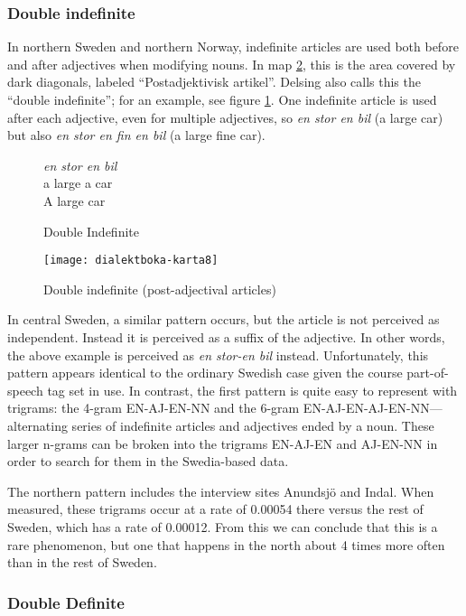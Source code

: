 \subsubsection{Double indefinite}

In northern Sweden and northern Norway, indefinite articles are used
both before and after adjectives when modifying nouns. In map
\ref{double-indefinite-map}, this is the area covered by dark
diagonals, labeled ``Postadjektivisk artikel''. Delsing also calls
this the ``double indefinite''; for an example, see figure
\ref{double-indefinite-example}. One indefinite article is used after
each adjective, even for multiple adjectives, so {\it en stor en bil}
(a large car) but also {\it en stor en fin en bil} (a large fine car).

\begin{figure}
  {\it en stor en bil} \\
  a large a car \\
  A large car
  \caption{Double Indefinite}
  \label{double-indefinite-example}
\end{figure}

\begin{figure}
  \texttt{[image: dialektboka-karta8]}
  \caption{Double indefinite (post-adjectival articles)}
  \label{double-indefinite-map}
\end{figure}

In central Sweden, a similar pattern occurs, but the article is not
perceived as independent. Instead it is perceived as a suffix of the
adjective. In other words, the above example is perceived as {\it en
  stor-en bil} instead. Unfortunately, this pattern appears identical
to the ordinary Swedish case given the course part-of-speech tag set
in use.  In contrast, the first pattern is quite easy to represent
with trigrams: the 4-gram EN-AJ-EN-NN and the
6-gram EN-AJ-EN-AJ-EN-NN---alternating series of indefinite articles
and adjectives ended by a noun. These larger n-grams can be broken into
the trigrams EN-AJ-EN and AJ-EN-NN in order to search for them in the
Swedia-based data.

The northern pattern includes the interview sites Anundsj\"o and
Indal. When measured, these trigrams occur at a rate of 0.00054 there
versus the rest of Sweden, which has a rate of 0.00012. From this we
can conclude that this is a rare phenomenon, but one that happens in
the north about 4 times more often than in the rest of Sweden.

\subsubsection{Double Definite}

